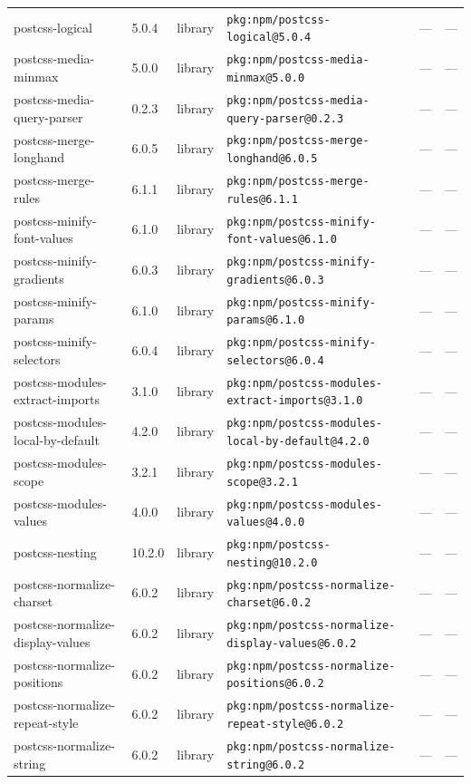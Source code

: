 \documentclass[11pt]{article}
\begin{document}
\begin{longtable}{|l|l|l|p{2.2cm}|l|p{4cm}|}
postcss-logical & 5.0.4 & library & \texttt{pkg:npm/postcss-logical@5.0.4} & — & — \\
postcss-media-minmax & 5.0.0 & library & \texttt{pkg:npm/postcss-media-minmax@5.0.0} & — & — \\
postcss-media-query-parser & 0.2.3 & library & \texttt{pkg:npm/postcss-media-query-parser@0.2.3} & — & — \\
postcss-merge-longhand & 6.0.5 & library & \texttt{pkg:npm/postcss-merge-longhand@6.0.5} & — & — \\
postcss-merge-rules & 6.1.1 & library & \texttt{pkg:npm/postcss-merge-rules@6.1.1} & — & — \\
postcss-minify-font-values & 6.1.0 & library & \texttt{pkg:npm/postcss-minify-font-values@6.1.0} & — & — \\
postcss-minify-gradients & 6.0.3 & library & \texttt{pkg:npm/postcss-minify-gradients@6.0.3} & — & — \\
postcss-minify-params & 6.1.0 & library & \texttt{pkg:npm/postcss-minify-params@6.1.0} & — & — \\
postcss-minify-selectors & 6.0.4 & library & \texttt{pkg:npm/postcss-minify-selectors@6.0.4} & — & — \\
postcss-modules-extract-imports & 3.1.0 & library & \texttt{pkg:npm/postcss-modules-extract-imports@3.1.0} & — & — \\
postcss-modules-local-by-default & 4.2.0 & library & \texttt{pkg:npm/postcss-modules-local-by-default@4.2.0} & — & — \\
postcss-modules-scope & 3.2.1 & library & \texttt{pkg:npm/postcss-modules-scope@3.2.1} & — & — \\
postcss-modules-values & 4.0.0 & library & \texttt{pkg:npm/postcss-modules-values@4.0.0} & — & — \\
postcss-nesting & 10.2.0 & library & \texttt{pkg:npm/postcss-nesting@10.2.0} & — & — \\
postcss-normalize-charset & 6.0.2 & library & \texttt{pkg:npm/postcss-normalize-charset@6.0.2} & — & — \\
postcss-normalize-display-values & 6.0.2 & library & \texttt{pkg:npm/postcss-normalize-display-values@6.0.2} & — & — \\
postcss-normalize-positions & 6.0.2 & library & \texttt{pkg:npm/postcss-normalize-positions@6.0.2} & — & — \\
postcss-normalize-repeat-style & 6.0.2 & library & \texttt{pkg:npm/postcss-normalize-repeat-style@6.0.2} & — & — \\
postcss-normalize-string & 6.0.2 & library & \texttt{pkg:npm/postcss-normalize-string@6.0.2} & — & — \\

\end{longtable}
\end{document}
